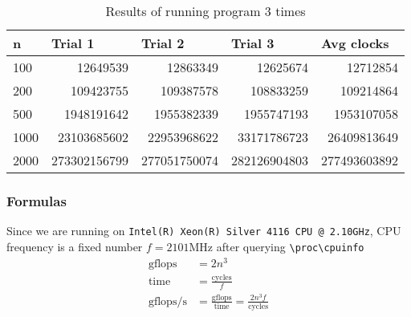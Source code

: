 \documentclass[12pt]{article}
\begin{document}
\begin{table}[H]
  \centering
  \begin{tabular}{lrrrr}
    \toprule
    n                           &
    \multicolumn{1}{l}{Trial 1} &
    \multicolumn{1}{l}{Trial 2} &
    \multicolumn{1}{l}{Trial 3} &
    \multicolumn{1}{l}{Avg clocks}                                                          \\
    \midrule
    100                         & 12649539     & 12863349     & 12625674     & 12712854     \\
    200                         & 109423755    & 109387578    & 108833259    & 109214864    \\
    500                         & 1948191642   & 1955382339   & 1955747193   & 1953107058   \\
    1000                        & 23103685602  & 22953968622  & 33171786723  & 26409813649  \\
    2000                        & 273302156799 & 277051750074 & 282126904803 & 277493603892 \\
    \bottomrule
  \end{tabular}
  \caption{Results of running program 3 times}
\end{table}


\subsubsection{Formulas}
Since we are running on \texttt{Intel(R) Xeon(R) Silver 4116 CPU @ 2.10GHz},
CPU frequency is a fixed number $f = 2101 \si{\MHz}$
after querying \lstinline{\proc\cpuinfo}
\begin{equation}
  \begin{aligned}
    \text{gflops}   & = 2n^3                                                             \\
    \text{time}     & = \frac{\text{cycles}}{f}                                          \\
    \text{gflops/s} & = \frac{\text{gflops}}{\text{time}} = \frac{2n^3 f}{\text{cycles}}
  \end{aligned}
\end{equation}
\end{document}
